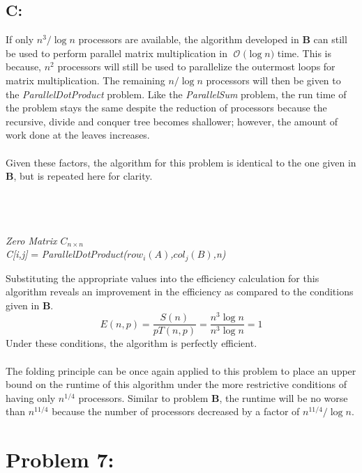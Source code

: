 \documentclass[12pt]{article}
\newcommand{\BigO}[1]{\ensuremath{\operatorname{\mathcal{O}}\bigl(#1\bigr)}}
\begin{document}
\subsection*{C:}
If only $n^3 / \log n$ processors are available, the algorithm
developed in \textbf{B} can still be used to perform parallel matrix
multiplication in \BigO{\log n} time.  This is because, $n^2$ processors
will still be used to parallelize the outermost loops for matrix
multiplication.  The remaining $n/\log n$ processors will then be
given to the \textit{ParallelDotProduct} problem.  Like the 
\textit{ParallelSum} problem, the run time of the problem stays the
same despite the reduction of processors because the recursive,
divide and conquer tree becomes shallower; however, the amount of 
work done at the leaves increases.\\\\
Given these factors, the algorithm for this problem is identical to
the one given in \textbf{B}, but is repeated here for clarity.\\\\
\begin{algorithm}[H]
\\
\\
\textit{Zero Matrix $C_{n\times n}$}\\
{
{
   \textit{C[i,j]} = \textit{ParallelDotProduct($row_i(A)$,$col_j(B)$,n)}\\ 
}
}
\end{algorithm}
Substituting the appropriate values into the efficiency calculation
for this algorithm reveals an improvement in the efficiency as 
compared to the conditions given in \textbf{B}.
\[
    E(n,p) = \frac{S(n)}{pT(n,p)} = \frac{n^3 \log n}{n^3 \log n} = 1 
\]
Under these conditions, the algorithm is perfectly efficient.\\\\
The folding principle can be once again applied to this problem to
place an upper bound on the runtime of this algorithm under the more
restrictive conditions of having only $n^{1/4}$ processors. Similar to 
problem \textbf{B}, the runtime will be no worse than $n^{11/4}$ because        
the number of processors decreased by a factor of $n^{11/4}/ \log n$.
\section*{Problem 7: }
\end{document}
